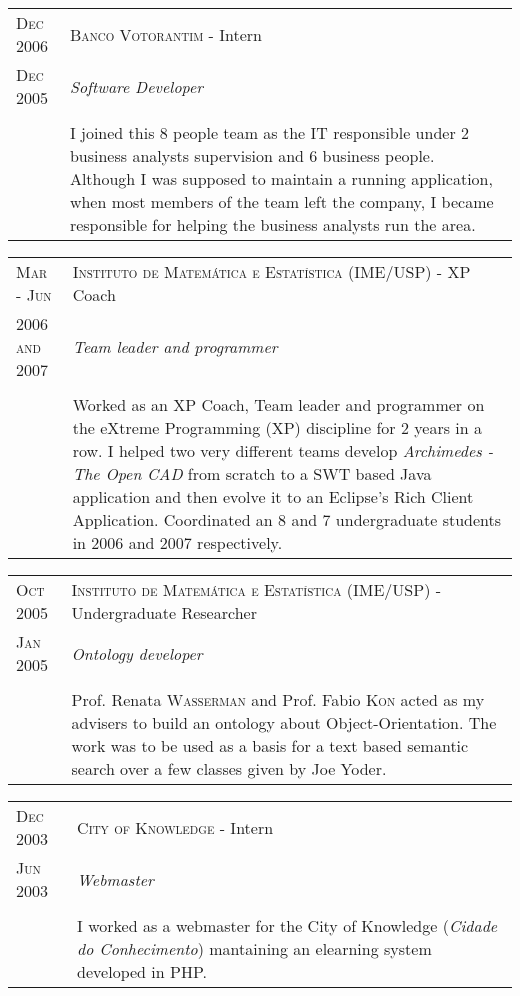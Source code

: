 \documentclass[letter,10pt]{article}
\begin{document}
\begin{tabular}{p{2.5cm}|p{13.5cm}}
  \textsc{Dec 2006} & \textsc{Banco Votorantim} - Intern\\
  \textsc{Dec 2005} &\emph{Software Developer}\\
  &\\
  &I joined this 8 people team as the IT responsible
  under 2 business analysts supervision and 6 business
  people. Although I was supposed to maintain a
  running application, when most members of the team left the company,
  I became responsible for helping the business analysts run the
  area.
\end{tabular}

\begin{tabular}{p{2.5cm}|p{13.5cm}}
  \textsc{Mar - Jun} & \textsc{Instituto de Matemática e Estatística
    (IME/USP)} - XP Coach\\
  \textsc{2006 and 2007}& \emph{Team leader and programmer}\\
  &\\
  &  Worked as an XP Coach, Team leader and programmer on the eXtreme
  Programming (XP) discipline for
  2 years in a row. I helped two very different teams develop
  \emph{Archimedes - The Open CAD} from scratch to a SWT based Java
  application and then evolve it to an Eclipse's Rich Client
  Application. Coordinated an 8 and 7 undergraduate students in
  2006 and 2007 respectively.
\end{tabular}

\begin{tabular}{p{2.5cm}|p{13.5cm}}
  \textsc{Oct 2005} & \textsc{Instituto de Matemática e Estatística
    (IME/USP)} - Undergraduate Researcher\\
  \textsc{Jan 2005}& \emph{Ontology developer}\\
  &\\
  & Prof. Renata \textsc{Wasserman} and Prof. Fabio \textsc{Kon} acted as my
  advisers to build an ontology about Object-Orientation. The work
  was to be used as a basis for a text based semantic search over a
  few classes given by Joe Yoder.
\end{tabular}

\begin{tabular}{p{2.5cm}|p{13.5cm}}
  \textsc{Dec 2003} & \textsc{City of Knowledge} - Intern\\
  \textsc{Jun 2003}& \emph{Webmaster}\\
  &\\
  & I worked as a webmaster for the City of Knowledge (\textit{Cidade
    do Conhecimento}) mantaining an elearning system developed in PHP.
\end{tabular}
\end{document}
